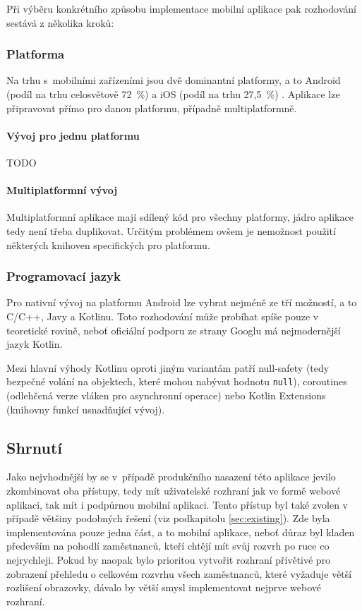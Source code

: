 \documentclass[twoside]{ctuthesis}
\begin{document}
Při výběru konkrétního způsobu implementace mobilní aplikace pak rozhodování sestává z několika kroků:

\subsubsection{Platforma}
Na trhu s~mobilními zařízeními jsou dvě dominantní platformy, a to Android (podíl na trhu celosvětově 72~\%) a iOS (podíl na trhu 27,5~\%) \cite{statcounter2021mobile}. Aplikace lze připravovat přímo pro danou platformu, případně multiplatformně.

\paragraph{Vývoj pro jednu platformu}
TODO


\paragraph{Multiplatformní vývoj}
Multiplatformní aplikace mají sdílený kód pro všechny platformy, jádro aplikace tedy není třeba duplikovat. Určitým problémem ovšem je nemožnost použití některých knihoven specifických pro platformu.



\subsubsection{Programovací jazyk}
Pro nativní vývoj na platformu Android lze vybrat nejméně ze tří možností, a to C/C++, Javy a Kotlinu. Toto rozhodování může probíhat spíše pouze v teoretické rovině, neboť oficiální podporu ze strany Googlu má nejmodernější jazyk Kotlin.

Mezi hlavní výhody Kotlinu oproti jiným variantám patří null-safety (tedy bezpečné volání na objektech, které mohou nabývat hodnotu \texttt{null}), coroutines (odlehčená verze vláken pro asynchronní operace) nebo Kotlin Extensions (knihovny funkcí usnadňující vývoj).


\subsection{Shrnutí}

Jako nejvhodnější by se v~případě produkčního nasazení této aplikace jevilo zkombinovat oba přístupy, tedy mít uživatelské rozhraní jak ve formě webové aplikaci, tak mít i podpůrnou mobilní aplikaci. Tento přístup byl také zvolen v případě většiny podobných řešení (viz podkapitolu \ref{sec:existing}). Zde byla implementována pouze jedna část, a to mobilní aplikace, neboť důraz byl kladen především na pohodlí zaměstnanců, kteří chtějí mít svůj rozvrh po ruce co nejrychleji. Pokud by naopak bylo prioritou vytvořit rozhraní přívětivé pro zobrazení přehledu o celkovém rozvrhu všech zaměstnanců, které vyžaduje větší rozlišení obrazovky, dávalo by větší smysl implementovat nejprve webové rozhraní.
\end{document}
